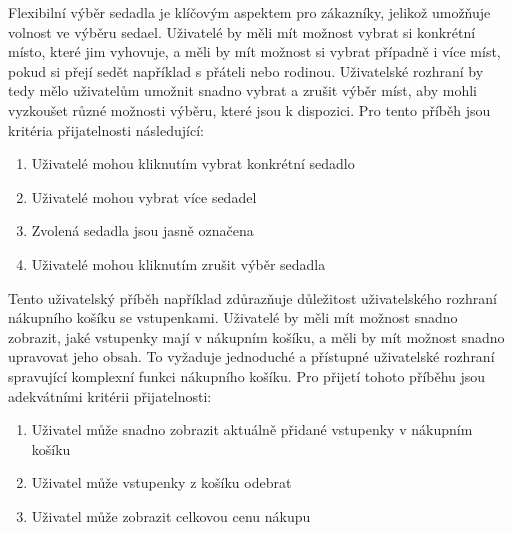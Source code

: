 \newcommand{\userstoryseatselection}{
}
\userstoryseatselection

Flexibilní výběr sedadla je klíčovým aspektem pro zákazníky, jelikož umožňuje volnost ve výběru sedael.
Uživatelé by měli mít možnost vybrat si konkrétní místo, které jim vyhovuje, a měli by mít možnost si vybrat případně i více míst, pokud si přejí sedět například s přáteli nebo rodinou.
Uživatelské rozhraní by tedy mělo uživatelům umožnit snadno vybrat a zrušit výběr míst, aby mohli vyzkoušet různé možnosti výběru, které jsou k dispozici.
Pro tento příběh jsou kritéria přijatelnosti následující:
\begin{enumerate}
    \item Uživatelé mohou kliknutím vybrat konkrétní sedadlo
    \item Uživatelé mohou vybrat více sedadel
    \item Zvolená sedadla jsou jasně označena
    \item Uživatelé mohou kliknutím zrušit výběr sedadla
\end{enumerate}

\newcommand{\userstoryshoppingcart}{
}
\userstoryshoppingcart

Tento uživatelský příběh například zdůrazňuje důležitost uživatelského rozhraní nákupního košíku se vstupenkami.
Uživatelé by měli mít možnost snadno zobrazit, jaké vstupenky mají v nákupním košíku, a měli by mít možnost snadno upravovat jeho obsah.
To vyžaduje jednoduché a přístupné uživatelské rozhraní spravující komplexní funkci nákupního košíku.
Pro přijetí tohoto příběhu jsou adekvátními kritérii přijatelnosti:
\begin{enumerate}
    \item Uživatel může snadno zobrazit aktuálně přidané vstupenky v nákupním košíku
    \item Uživatel může vstupenky z košíku odebrat
    \item Uživatel může zobrazit celkovou cenu nákupu
\end{enumerate}

\newcommand{\userstorycheckout}{
}
\userstorycheckout

